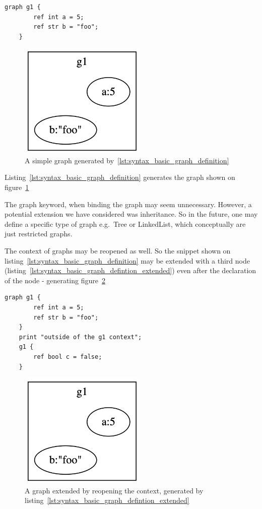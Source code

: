 \begin{lstlisting}[caption={Graph declaration.}, captionpos=b, label={lst:syntax_basic_graph_definition}]
    graph g1 {
        ref int a = 5;
        ref str b = "foo";
    }
\end{lstlisting}

\begin{figure}[H]
    \centering
    \includegraphics[width=6cm]{figures/syntax_section/syntax_simple_graph}
    \caption{A simple graph generated by~\ref{lst:syntax_basic_graph_definition}}
    \label{fig:syntax_basic_graph}
\end{figure}

Listing~\ref{lst:syntax_basic_graph_definition} generates the graph shown on figure~\ref{fig:syntax_basic_graph}

The graph keyword, when binding the graph may seem unnecessary.
However, a potential extension we have considered was inheritance.
So in the future, one may define a specific type of graph
e.g.\ Tree or LinkedList, which conceptually are just restricted graphs.

The context of graphs may be reopened as well.
So the snippet shown on listing~\ref{lst:syntax_basic_graph_definition}
may be extended with a third node (listing~\ref{lst:syntax_basic_graph_defintion_extended})
even after the declaration of the node - generating figure~\ref{fig:syntax_basic_graph_extended}

\begin{lstlisting}[caption={Extending a graph.},captionpos=b,label={lst:syntax_basic_graph_defintion_extended}]
    graph g1 {
        ref int a = 5;
        ref str b = "foo";
    }
    print "outside of the g1 context";
    g1 {
        ref bool c = false;
    }
\end{lstlisting}

\begin{figure}[H]
    \centering
    \includegraphics[width=6cm]{figures/syntax_section/syntax_simple_graph}
    \caption{A graph extended by reopening the context, generated by listing~\ref{lst:syntax_basic_graph_defintion_extended}}
    \label{fig:syntax_basic_graph_extended}
\end{figure}


